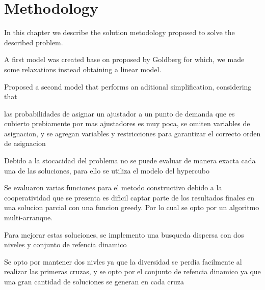 \chapter{Methodology}
In this chapter
we describe the solution metodology proposed
to solve the described problem.

A first model was created
base on proposed by Goldberg \cite{goldberg1990validating}
for which,
we made some relaxations
instead obtaining a linear model.

Proposed a second model
that performs an aditional simplification,
considering that

las probabilidades de asignar
un ajustador 
a un punto de demanda
que es cubierto prebiamente por mas ajustadores
es muy poca,
se omiten variables de asignacion,
y se agregan variables y restricciones
para garantizar
el correcto orden de asignacion

Debido a la stocacidad del problema
no se puede evaluar de manera exacta
cada una de las soluciones,
para ello se utiliza el modelo del hypercubo

Se evaluaron varias funciones
para el metodo constructivo
debido a la cooperatividad que se presenta
es dificil
captar parte de los resultados finales
en una solucion parcial
con una funcion greedy.
Por lo cual se opto
por un algoritmo multi-arranque.

Para mejorar estas soluciones,
se implemento una busqueda dispersa
con dos niveles y conjunto de refencia dinamico

Se opto por mantener dos nivles
ya que
la diversidad
se perdia facilmente
al realizar las primeras cruzas,
y se opto
por el conjunto de refencia dinamico
ya que una gran cantidad de soluciones se generan
en cada cruza
